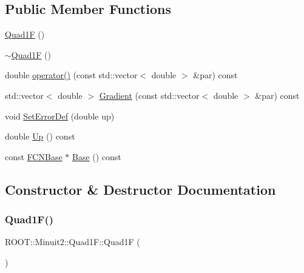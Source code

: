 \subsection*{Public Member Functions}
\begin{DoxyCompactItemize}
\item 
\mbox{\hyperlink{classROOT_1_1Minuit2_1_1Quad1F_afa0e15d8d1ead62a8b65fa402d0188fd}{Quad1F}} ()
\item 
\mbox{\hyperlink{classROOT_1_1Minuit2_1_1Quad1F_afed3b55617565f188fcfad81bdf4dfda}{$\sim$\+Quad1F}} ()
\item 
double \mbox{\hyperlink{classROOT_1_1Minuit2_1_1Quad1F_a879588547439114ea9ad1e749f1300c5}{operator()}} (const std\+::vector$<$ double $>$ \&par) const
\item 
std\+::vector$<$ double $>$ \mbox{\hyperlink{classROOT_1_1Minuit2_1_1Quad1F_a5862cb7b7c00f86bcff155d0033abd7f}{Gradient}} (const std\+::vector$<$ double $>$ \&par) const
\item 
void \mbox{\hyperlink{classROOT_1_1Minuit2_1_1Quad1F_a086ed11e56374ff0331676d7eac34395}{Set\+Error\+Def}} (double up)
\item 
double \mbox{\hyperlink{classROOT_1_1Minuit2_1_1Quad1F_a14469d6031751fa382120df6327da5ee}{Up}} () const
\item 
const \mbox{\hyperlink{classROOT_1_1Minuit2_1_1FCNBase}{F\+C\+N\+Base}} $\ast$ \mbox{\hyperlink{classROOT_1_1Minuit2_1_1Quad1F_ae1c01c02e015da9f172c3aa2d3089e85}{Base}} () const
\end{DoxyCompactItemize}


\subsection{Constructor \& Destructor Documentation}
\mbox{\label{classROOT_1_1Minuit2_1_1Quad1F_afa0e15d8d1ead62a8b65fa402d0188fd}} 
\subsubsection{\texorpdfstring{Quad1F()}{Quad1F()}}
{\footnotesize\ttfamily R\+O\+O\+T\+::\+Minuit2\+::\+Quad1\+F\+::\+Quad1F (\begin{DoxyParamCaption}{ }\end{DoxyParamCaption})\hspace{0.3cm}{\ttfamily [inline]}}

